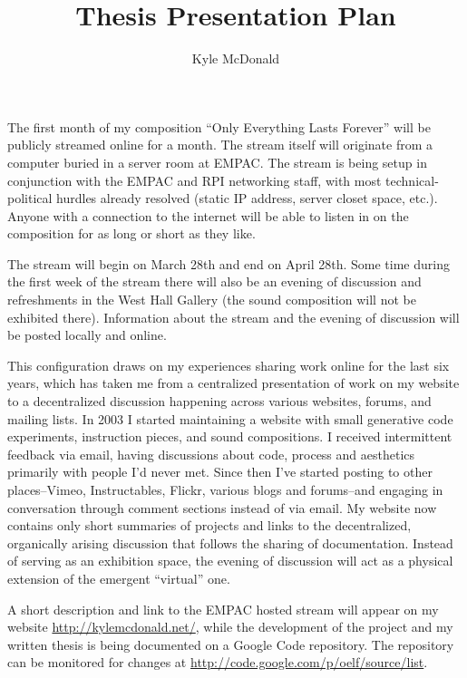\documentclass{article}
\title{Thesis Presentation Plan}
\author{Kyle McDonald}
\begin{document}
\maketitle

The first month of my composition ``Only Everything Lasts Forever'' will be publicly streamed online for a month. The stream itself will originate from a computer buried in a server room at EMPAC. The stream is being setup in conjunction with the EMPAC and RPI networking staff, with most technical-political hurdles already resolved (static IP address, server closet space, etc.). Anyone with a connection to the internet will be able to listen in on the composition for as long or short as they like.

The stream will begin on March 28th and end on April 28th. Some time during the first week of the stream there will also be an evening of discussion and refreshments in the West Hall Gallery (the sound composition will not be exhibited there). Information about the stream and the evening of discussion will be posted locally and online.

This configuration draws on my experiences sharing work online for the last six years, which has taken me from a centralized presentation of work on my website to a decentralized discussion happening across various websites, forums, and mailing lists. In 2003 I started maintaining a website with small generative code experiments, instruction pieces, and sound compositions. I received intermittent feedback via email, having discussions about code, process and aesthetics primarily with people I'd never met. Since then I've started posting to other places--Vimeo, Instructables, Flickr, various blogs and forums--and engaging in conversation through comment sections instead of via email. My website now contains only short summaries of projects and links to the decentralized, organically arising discussion that follows the sharing of documentation. Instead of serving as an exhibition space, the evening of discussion will act as a physical extension of the emergent ``virtual'' one.

A short description and link to the EMPAC hosted stream will appear on my website \url{http://kylemcdonald.net/}, while the development of the project and my written thesis is being documented on a Google Code repository. The repository can be monitored for changes at \url{http://code.google.com/p/oelf/source/list}.
\end{document}
